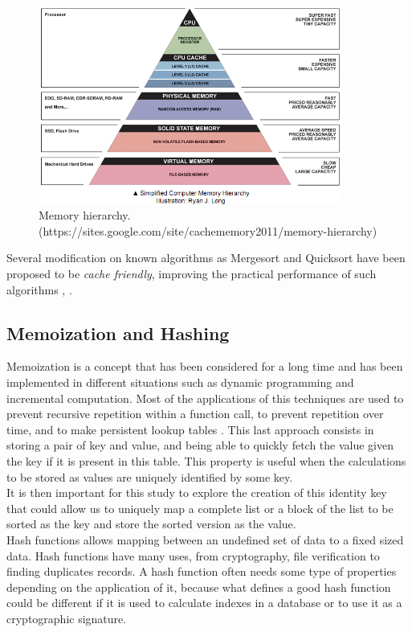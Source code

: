 \documentclass[a4paper,12pt]{article}
\begin{document}
\begin{figure}[H]
\centering
\includegraphics[height=6.5cm,keepaspectratio]{./images/ComputerMemoryHierarchy.png}
\caption{Memory hierarchy. (https://sites.google.com/site/cachememory2011/memory-hierarchy)}
\label{fig:Memory}
\end{figure}

Several modification on known algorithms as Mergesort and Quicksort have been proposed to be {\it cache friendly}, improving the practical performance of such algorithms \cite{lamarca1999influence},  \cite{xiao2000improving}.


\subsection{Memoization and Hashing} \label{memoHash}

Memoization is a concept that has been considered for a long time and has been implemented in different situations \cite{acar2003selective} such as dynamic programming and incremental computation. Most of the applications of this techniques are used to prevent recursive repetition within a function call, to prevent repetition over time, and to
make persistent lookup tables \cite{hall1997improving}. This last approach consists in storing a pair of key and value, and being able to quickly fetch the value given the key if it is present in this table. This property is useful when the calculations to be stored as values are uniquely identified by some key. \\

It is then important for this study to explore the creation of this identity key that could allow us to uniquely map a complete list or a block of the list to be sorted as the key and store the sorted version as the value. \\

Hash functions allows mapping between an undefined set of data to a fixed sized data. Hash functions have many uses, from cryptography, file verification to finding duplicates records. A hash function often needs some type of properties depending on the application of it, because what defines a good hash function could be different if it is used to calculate indexes in a database or to use it as a cryptographic signature. \\
\end{document}
